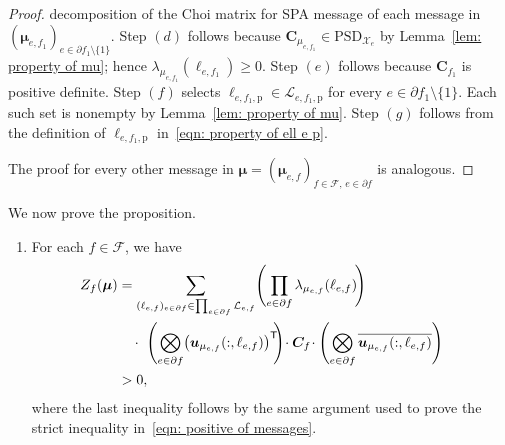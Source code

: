\documentclass[journal]{IEEEtran}
\newcommand{\vect}[1]{ \bm{#1} }
\newcommand{\set}[1]{\mathcal{#1}}
\newcommand{\setF}{ \mathcal{F} }
\newcommand{\setpf}{ \partial f }
\newcommand{\tran}{\mathsf{T}}
\newcommand{\setxe}{ \mathcal{X}_{e} }
\newcommand{\vmu}{ \vect{ \mu } }
\newcommand{\setPSD}[1]{ \mathrm{PSD}_{#1} }
\newcommand{\etof}{ e,f }
\newcommand{\matr}[1]{\vect{#1}}
\newcommand{\etofone}{ e, f_1 }
\begin{document}
\begin{appendices}
\begin{proof}
{      decomposition of the Choi matrix for SPA message} of each message in
    $ ( \vmu_{e,f_{1}} )_{e \in \setpf_{1} \setminus \{1\}} $. Step $(d)$
    follows because $ \matr{C}_{\mu_{e,f_1}} \in \setPSD{\setxe} $ by
    Lemma~\ref{lem: property of mu}; hence
    $ \lambda_{\mu_{\etofone}}( \ell_{e,f_1} ) \geq 0 $. Step $(e)$ follows
    because $ \matr{C}_{f_1} $ is positive definite. Step $(f)$ selects
    $ \ell_{e,f_{1}, \mathrm{p}} \in \set{L}_{e,f_{1},\mathrm{p}} $ for every
    $ e \in \setpf_{1}\setminus\{1\} $. Each such set is nonempty by
    Lemma~\ref{lem: property of mu}. Step $(g)$ follows from the definition of
    $ \ell_{e,f_{1}, \mathrm{p}} $ in~\eqref{eqn: property of ell e p}.

    The proof for every other message in
    $ \vmu =  (\vmu_{e,f})_{f \in \setF,\,e \in \setpf} $ is analogous.
  \end{proof}

  We now prove the proposition.
  \begin{enumerate}
    \item For each $ f \in \setF $, we have
          \begin{align*}
            \hspace{-0.5cm}
            Z_f(\vmu)
             & =
            \sum_{ \substack{
                (\ell_{e,f})_{e \in \setpf} \in \prod_{e \in \setpf} \set{L}_{e,f}
              } }
            \Biggl(
            \prod_{ e \in \setpf }
            \lambda_{\mu_{\etof}}( \ell_{e,f} )
            \!\Biggr)
            \\&\quad
            \cdot \
            \Biggl(
            \mathop{\bigotimes}_{ e \in \setpf }
            \bigl( \matr{u}_{\mu_{\etof}}(:, \ell_{e,f} ) \bigr)^{\tran}
            \!\!\Biggr)\!\cdot \matr{C}_{f}\!\cdot
            \Biggl(
            \mathop{\bigotimes}_{ e \in \setpf }
            \overline{ \matr{u}_{\mu_{\etof}}(:, \ell_{e,f} ) }
            \Biggr) \\& >0,
          \end{align*}
          where the last inequality follows by the same argument used to prove the strict inequality in~\eqref{eqn: positive of messages}.


\end{enumerate}
\end{appendices}
\end{document}

